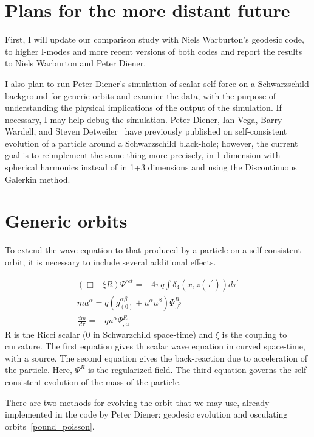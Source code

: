 \section{Plans for the more distant future}
First, I will update our comparison study with Niels Warburton's geodesic code, to higher l-modes and more recent versions of both codes and report the results to Niels Warburton and Peter Diener.  

I also plan to run Peter Diener's simulation of scalar self-force on a Schwarzschild background for generic orbits and examine the data, with the purpose of understanding the physical implications of the output of the simulation. If necessary, I may help debug the simulation. Peter Diener, Ian Vega, Barry Wardell, and Steven Detweiler~\cite{diener_vega_wardell_detweiler} have previously published on self-consistent evolution of a particle around a Schwarzschild black-hole; however, the current goal is to reimplement the same thing more precisely, in 1 dimension with spherical harmonics instead of in 1+3 dimensions and using the Discontinuous Galerkin method. 

\section{Generic orbits}
To extend the wave equation to that produced by a particle on a self-consistent orbit, it is necessary to include several additional effects.

\begin{eqnarray}
  (\Box - \xi R)\Psi^{ret} = -4\pi q \int\delta_4(x,z(\tau^\prime))d\tau^\prime\\
    ma^\alpha=q(g^{\alpha\beta}_{(0)}+u^\alpha u^\beta)\Psi^{R}_{,\beta}\\
    \frac{dm}{d\tau}=-q u^\alpha\Psi^R_{,\alpha}
    \label{genericev}
\end{eqnarray}
R is the Ricci scalar (0 in Schwarzchild space-time) and $\xi$ is the coupling to curvature. The first equation gives th scalar wave equation in curved space-time, with a source. The second equation gives the back-reaction due to acceleration of the particle. Here, $\Psi^R$ is the regularized field. The third equation governs the self-consistent evolution of the mass of the particle.~\cite{WardellSelfForceReview}

There are two methods for evolving the orbit that we may use, already implemented in the code by Peter Diener: geodesic evolution and osculating orbits~\ref{pound_poisson}.

